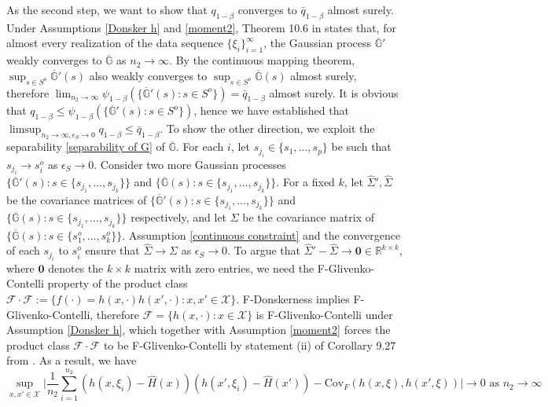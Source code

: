 \documentclass[mnsc,blindrev]{informs4} %
\newcommand{\R}{\mathbb{R}}
\begin{document}
As the second step, we want to show that $q_{1-\beta}$ converges to $\bar{q}_{1-\beta}$ almost surely. Under Assumptions \ref{Donsker h} and \ref{moment2}, Theorem 10.6 in \cite{kosorok2008introduction} states that, for almost every realization of the data sequence $\{\xi_i\}_{i=1}^{\infty}$, the Gaussian process $\overline{\mathbb G}'$ weakly converges to $\overline{\mathbb G}$ as $n_2\to\infty$. By the continuous mapping theorem, $\sup_{s\in S^o}\overline{\mathbb G}'(s)$ also weakly converges to $\sup_{s\in S^o}\overline{\mathbb G}(s)$ almost surely, therefore $\lim_{n_2\to\infty}\psi_{1-\beta}(\{\overline{\mathbb G}'(s):s\in S^o\})= \bar{q}_{1-\beta}$ almost surely. It is obvious that $q_{1-\beta}\leq \psi_{1-\beta}(\{\overline{\mathbb G}'(s):s\in S^o\})$, hence we have established that $\limsup_{n_2\to\infty,\epsilon_S\to 0}q_{1-\beta}\leq \bar{q}_{1-\beta}$. To show the other direction, we exploit the separability \eqref{separability of G} of $\overline{\mathbb G}$. For each $i$, let $s_{j_i}\in \{s_1,\ldots,s_p\}$ be such that $s_{j_i}\to s^o_i$ as $\epsilon_S\to 0$. Consider two more Gaussian processes $\{\overline{\mathbb G}'(s):s\in\{s_{j_1},\ldots,s_{j_k}\}\}$ and $\{\overline{\mathbb G}(s):s\in\{s_{j_1},\ldots,s_{j_k}\}\}$. For a fixed $k$, let $\hat \Sigma',\hat \Sigma$ be the covariance matrices of $\{\overline{\mathbb G}'(s):s\in\{s_{j_1},\ldots,s_{j_k}\}\}$ and $\{\overline{\mathbb G}(s):s\in\{s_{j_1},\ldots,s_{j_k}\}\}$ respectively, and let $\Sigma$ be the covariance matrix of $\{\overline{\mathbb G}(s):s\in\{s^o_1,\ldots,s^o_k\}\}$. Assumption \ref{continuous constraint} and the convergence of each $s_{j_i}$ to $s^o_i$ ensure that $\hat\Sigma\to \Sigma$ as $\epsilon_S\to 0$. To argue that $\hat \Sigma'-\hat \Sigma\to \mathbf{0}\in \R^{k\times k}$, where $\mathbf{0}$ denotes the $k\times k$ matrix with zero entries, we need the F-Glivenko-Contelli property of the product class $\mathcal F\cdot \mathcal F:=\{f(\cdot)=h(x,\cdot)h(x',\cdot):x,x'\in\mathcal X\}$. F-Donskerness implies F-Glivenko-Contelli, therefore $\mathcal F=\{h(x,\cdot):x\in\mathcal X\}$ is F-Glivenko-Contelli under Assumption \ref{Donsker h}, which together with Assumption \ref{moment2} forces the product class $\mathcal F\cdot \mathcal F$ to be F-Glivenko-Contelli by statement (ii) of Corollary 9.27 from \cite{kosorok2008introduction}. As a result, we have
\begin{equation*}
   \sup_{x,x'\in\mathcal X}\big\vert \frac{1}{n_2}\sum_{i=1}^{n_2}(h(x,\xi_i)-\hat H(x))(h(x',\xi_i)-\hat H(x'))-\mathrm{Cov}_F(h(x,\xi),h(x',\xi))\big\rvert\to 0\text{ as }n_2\to\infty
\end{equation*}
\end{document}
